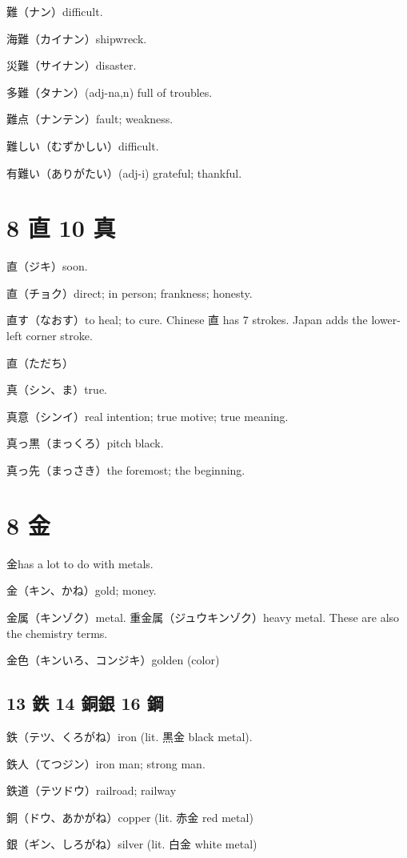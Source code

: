 難（ナン）difficult.

海難（カイナン）shipwreck.

災難（サイナン）disaster.

多難（タナン）(adj-na,n) full of troubles.

難点（ナンテン）fault; weakness.

難しい（むずかしい）difficult.

有難い（ありがたい）(adj-i) grateful; thankful.

\section{8 直 10 真}

直（ジキ）soon.

直（チョク）direct; in person; frankness; honesty.

直す（なおす）to heal; to cure.
Chinese 直 has 7 strokes.
Japan adds the lower-left corner stroke.

直（ただち）

真（シン、ま）true.

真意（シンイ）real intention; true motive; true meaning.

真っ黒（まっくろ）pitch black.

真っ先（まっさき）the foremost; the beginning.

\section{8 金}

金has a lot to do with metals.

金（キン、かね）gold; money.

金属（キンゾク）metal.
重金属（ジュウキンゾク）heavy metal.
These are also the chemistry terms.

金色（キンいろ、コンジキ）golden (color)

\subsection{13 鉄 14 銅銀 16 鋼}

鉄（テツ、くろがね）iron (lit. 黒金 black metal).

鉄人（てつジン）iron man; strong man.

鉄道（テツドウ）railroad; railway

銅（ドウ、あかがね）copper (lit. 赤金 red metal)

銀（ギン、しろがね）silver (lit. 白金 white metal)

